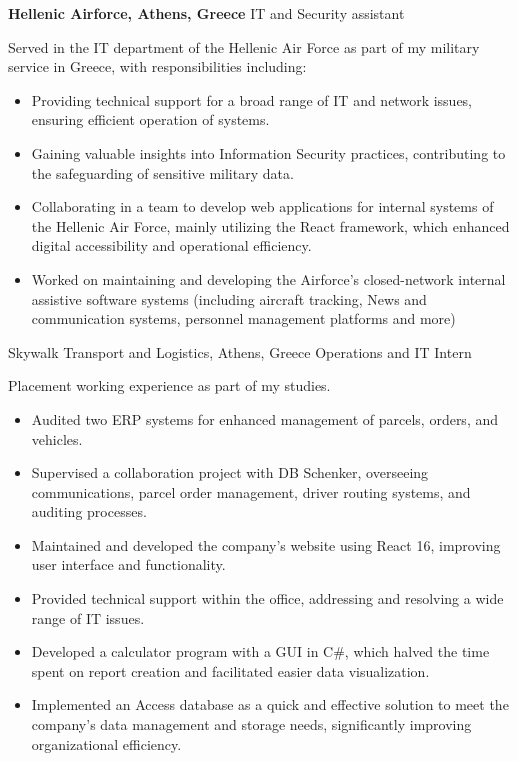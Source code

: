 {\textbf{Hellenic Airforce, Athens, Greece}}
{IT and Security assistant}
{
    Served in the IT department of the Hellenic Air Force as part of my military service in Greece, with
    responsibilities including:
    \begin{itemize}
        \item  Providing technical support for a broad range of IT and network issues, ensuring efficient operation of systems.
        \item Gaining valuable insights into Information Security practices, contributing to the safeguarding of sensitive military data.
        \item Collaborating in a team to develop web applications for internal systems of the Hellenic Air Force, mainly utilizing the React framework, which enhanced digital accessibility and operational efficiency.
        \item Worked on maintaining and developing the Airforce's closed-network internal assistive software systems (including aircraft tracking, News and communication systems, personnel management platforms and more)
    \end{itemize}
}

{Skywalk Transport and Logistics, Athens, Greece }
{Operations and IT Intern}
{

    Placement working experience as part of my studies.
    \begin{itemize}
        \item Audited two ERP systems for enhanced management of parcels, orders, and vehicles.
        \item Supervised a collaboration project with DB Schenker, overseeing communications, parcel order management, driver routing systems, and auditing processes.
        \item Maintained and developed the company's website using React 16, improving user interface and functionality.
        \item Provided technical support within the office, addressing and resolving a wide range of IT issues.
        \item Developed a calculator program with a GUI in C\#, which halved the time spent on report creation and facilitated easier data visualization.
        \item Implemented an Access database as a quick and effective solution to meet the company's data management and storage needs, significantly improving organizational efficiency.

    \end{itemize}
}

